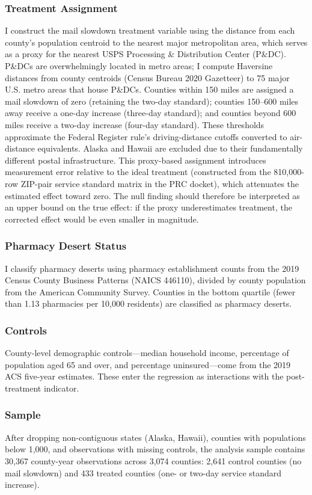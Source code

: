 \documentclass[12pt]{article}
\begin{document}
\subsubsection*{Treatment Assignment} I construct the mail slowdown treatment variable using the distance from each county's population centroid to the nearest major metropolitan area, which serves as a proxy for the nearest USPS Processing \& Distribution Center (P\&DC). P\&DCs are overwhelmingly located in metro areas; I compute Haversine distances from county centroids (Census Bureau 2020 Gazetteer) to 75 major U.S. metro areas that house P\&DCs. Counties within 150 miles are assigned a mail slowdown of zero (retaining the two-day standard); counties 150--600 miles away receive a one-day increase (three-day standard); and counties beyond 600 miles receive a two-day increase (four-day standard). These thresholds approximate the Federal Register rule's driving-distance cutoffs converted to air-distance equivalents. Alaska and Hawaii are excluded due to their fundamentally different postal infrastructure. This proxy-based assignment introduces measurement error relative to the ideal treatment (constructed from the 810,000-row ZIP-pair service standard matrix in the PRC docket), which attenuates the estimated effect toward zero. The null finding should therefore be interpreted as an upper bound on the true effect: if the proxy underestimates treatment, the corrected effect would be even smaller in magnitude.

\subsubsection*{Pharmacy Desert Status} I classify pharmacy deserts using pharmacy establishment counts from the 2019 Census County Business Patterns (NAICS 446110), divided by county population from the American Community Survey. Counties in the bottom quartile (fewer than 1.13 pharmacies per 10,000 residents) are classified as pharmacy deserts.

\subsubsection*{Controls} County-level demographic controls---median household income, percentage of population aged 65 and over, and percentage uninsured---come from the 2019 ACS five-year estimates. These enter the regression as interactions with the post-treatment indicator.

\subsubsection*{Sample} After dropping non-contiguous states (Alaska, Hawaii), counties with populations below 1,000, and observations with missing controls, the analysis sample contains 30,367 county-year observations across 3,074 counties: 2,641 control counties (no mail slowdown) and 433 treated counties (one- or two-day service standard increase).
\end{document}
